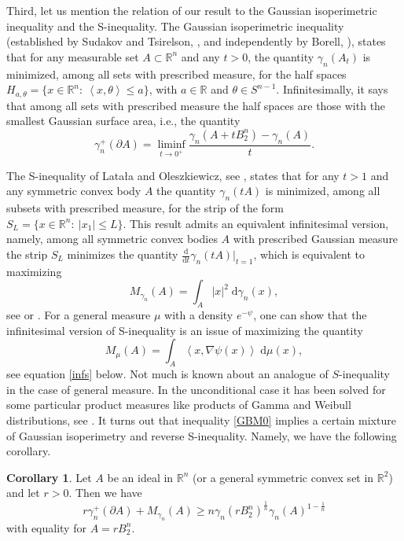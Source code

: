 \documentclass[11pt]{article}
\newcommand{\call}[4]{\int_{#1}^{#2} {#3} \; \textrm{d} {#4}}
\newcommand{\mb}[1]{\mathbb{{#1}}}
\newcommand{\1}{\mathbf{{1}}}
\newcommand{\po}[2]{\frac{\textrm{d} #1}{\textrm{d} #2}}
\newcommand{\scal}[2]{\left\langle #1, #2 \right\rangle}
\theoremstyle{definition}
\newtheorem{cor}{Corollary}
\begin{document}
Third, let us mention the relation of our result to the Gaussian isoperimetric inequality and the S-inequality. The  Gaussian isoperimetric inequality (established by Sudakov and Tsirelson, \cite{ST}, and independently by Borell, \cite{B2}),   states that for any measurable set $A \subset \mb{R}^n$ and any $t>0$, the quantity $\gamma_n(A_t)$ is minimized, among all sets with prescribed measure, for the half spaces $H_{a,\theta} = \{x \in \mb{R}^n: \ \scal{x}{\theta} \leq a\}$, with $a \in \mb{R}$ and $\theta \in S^{n-1}$. Infinitesimally, it says that among all sets with prescribed measure the half spaces are those with the smallest Gaussian surface area, i.e., the quantity
\[	
	\gamma_n^+(\partial A) = \liminf_{t \to 0^+} \frac{ \gamma_n(A+tB_2^n)-\gamma_n(A) }{t}.
\]

The S-inequality of Lata{\l}a and Oleszkiewicz, see \cite{LO}, states that for any $t>1$ and any symmetric convex body $A$ the quantity $\gamma_n(tA)$ is minimized, among all subsets with prescribed measure, for the strip of the form $S_L =\{x \in \mb{R}^n: \ |x_1| \leq L\}$. This result admits an equivalent infinitesimal version, namely, among all symmetric convex bodies $A$ with prescribed Gaussian measure the strip $S_L$ minimizes the quantity $\po{}{t}\gamma_n(tA)\big|_{t=1}$, which is equivalent to maximizing
\[
	M_{\gamma_n}(A) = \call{A}{}{|x|^2}{\gamma_n(x)},
\]
see \cite{KS} or \cite{NT3}.
For a general measure $\mu$ with a density $e^{-\psi}$, one can show that the infinitesimal version of S-inequality is an issue of maximizing the quantity
\begin{equation}
	M_\mu(A) = \call{A}{}{\scal{x}{\nabla \psi (x)}}{\mu(x)},
\end{equation}
see equation \eqref{infs} below.
Not much is known about an analogue of $S$-inequality in the case of general measure. In the unconditional case it has been solved for some particular product measures like products of Gamma and Weibull distributions, see \cite{NT2}. It turns out that inequality \eqref{GBM0} implies a certain mixture of Gaussian isoperimetry and reverse S-inequality. Namely, we have the following corollary.

\begin{cor}\label{MinFir}
Let $A$ be an ideal in $\mb{R}^n$ (or a general symmetric convex set in $\mb{R}^2$) and let $r>0$. Then we have
\[
	r \gamma_n^+(\partial A) + M_{\gamma_n}(A) \geq n \gamma_n(rB_2^n)^{\frac{1}{n}} \gamma_n(A)^{1-\frac{1}{n}}
\]
with equality for $A=rB_2^n$.
\end{cor}
\end{document}
